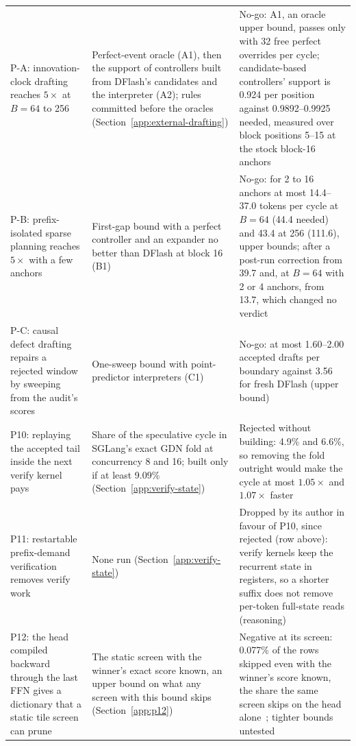 {\begin{longtable}{@{}P{5.2cm}P{4.6cm}P{6.5cm}@{}}
P-A: innovation-clock drafting reaches $5\times$ at $B=64$ to 256 & Perfect-event oracle (A1), then the support of controllers built from DFlash's candidates and the interpreter (A2); rules committed before the oracles (Section~\ref{app:external-drafting}) & No-go: A1, an oracle upper bound, passes only with 32 free perfect overrides per cycle; candidate-based controllers' support is 0.924 per position against 0.9892--0.9925 needed, measured over block positions 5--15 at the stock block-16 anchors~\\
P-B: prefix-isolated sparse planning reaches $5\times$ with a few anchors & First-gap bound with a perfect controller and an expander no better than DFlash at block 16 (B1) & No-go: for 2 to 16 anchors at most 14.4--37.0 tokens per cycle at $B=64$ (44.4 needed) and 43.4 at 256 (111.6), upper bounds; after a post-run correction from 39.7 and, at $B=64$ with 2 or 4 anchors, from 13.7, which changed no verdict~\\
P-C: causal defect drafting repairs a rejected window by sweeping from the audit's scores & One-sweep bound with point-predictor interpreters (C1) & No-go: at most 1.60--2.00 accepted drafts per boundary against 3.56 for fresh DFlash (upper bound)~\\
P10: replaying the accepted tail inside the next verify kernel pays & Share of the speculative cycle in SGLang's exact GDN fold at concurrency 8 and 16; built only if at least 9.09\% (Section~\ref{app:verify-state}) & Rejected without building: 4.9\% and 6.6\%, so removing the fold outright would make the cycle at most $1.05\times$ and $1.07\times$ faster~\\
P11: restartable prefix-demand verification removes verify work & None run (Section~\ref{app:verify-state}) & Dropped by its author in favour of P10, since rejected (row above): verify kernels keep the recurrent state in registers, so a shorter suffix does not remove per-token full-state reads (reasoning)\\
P12: the head compiled backward through the last FFN gives a dictionary that a static tile screen can prune & The static screen with the winner's exact score known, an upper bound on what any screen with this bound skips (Section~\ref{app:p12}) & Negative at its screen: 0.077\% of the rows skipped even with the winner's score known, the share the same screen skips on the head alone~; tighter bounds untested\\

\end{longtable}}
